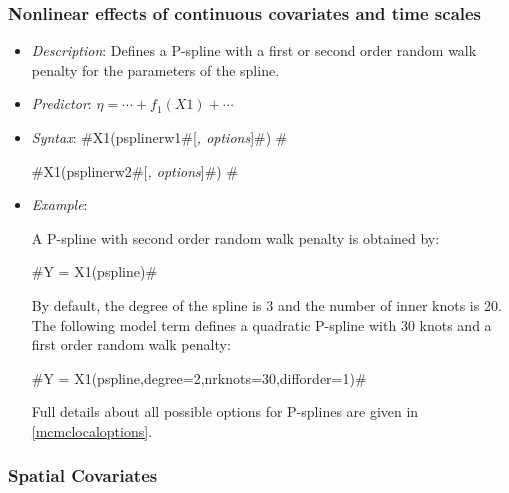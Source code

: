 

\subsubsection*{Nonlinear effects of continuous covariates and time scales}


\begin{itemize}
\item[] {\em Description}: Defines a P-spline with a first or
second order random walk penalty for the parameters of the spline.

\item[] {\em Predictor}: $\eta =  \cdots + f_1(X1) + \cdots$

\item[] {\em Syntax}:
#X1(psplinerw1#[{\em , options}]#) #

#X1(psplinerw2#[{\em , options}]#) #

\item[] {\em Example}:

A P-spline with second order random walk penalty is obtained by:

#Y = X1(pspline)#

By default, the degree of the spline is 3 and the number of inner
knots is 20. The following model term defines a quadratic P-spline
with 30 knots and a first order random walk penalty:

#Y = X1(pspline,degree=2,nrknots=30,difforder=1)#

Full details about all possible options for P-splines are given in
\autoref{mcmclocaloptions}.
\end{itemize}



\subsubsection*{Spatial Covariates}

